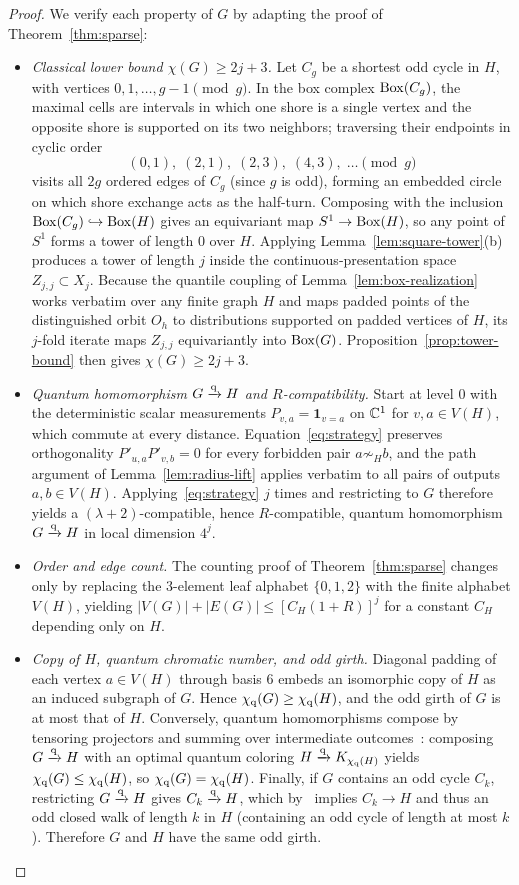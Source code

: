 \begin{proof}
We verify each property of $G$ by adapting the proof of Theorem~\ref{thm:sparse}:
\begin{itemize}
\item \emph{Classical lower bound $\chi(G)\ge2j+3$.} Let $C_g$ be a shortest odd cycle in $H$, with vertices $0,1,\ldots,g-1\pmod g$. In the box complex $\operatorname{Box}(C_g)$, the maximal cells are intervals in which one shore is a single vertex and the opposite shore is supported on its two neighbors; traversing their endpoints in cyclic order
\[
 (0,1),\;(2,1),\;(2,3),\;(4,3),\;\ldots\pmod g
\]
visits all $2g$ ordered edges of $C_g$ (since $g$ is odd), forming an embedded circle on which shore exchange acts as the half-turn. Composing with the inclusion $\operatorname{Box}(C_g)\hookrightarrow\operatorname{Box}(H)$ gives an equivariant map $S^1\to\operatorname{Box}(H)$, so any point of $S^1$ forms a tower of length $0$ over $H$. Applying Lemma~\ref{lem:square-tower}(b) produces a tower of length $j$ inside the continuous-presentation space $Z_{j,j}\subset X_j$. Because the quantile coupling of Lemma~\ref{lem:box-realization} works verbatim over any finite graph $H$ and maps padded points of the distinguished orbit $O_h$ to distributions supported on padded vertices of $H$, its $j$-fold iterate maps $Z_{j,j}$ equivariantly into $\operatorname{Box}(G)$. Proposition~\ref{prop:tower-bound} then gives $\chi(G)\ge2j+3$.
\item \emph{Quantum homomorphism $G\xrightarrow{\mathrm q} H$ and $R$-compatibility.} Start at level $0$ with the deterministic scalar measurements $P_{v,a}=\mathbf 1_{v=a}$ on $\mathbb C^1$ for $v,a\in V(H)$, which commute at every distance. Equation~\eqref{eq:strategy} preserves orthogonality $P'_{u,a}P'_{v,b}=0$ for every forbidden pair $a\not\sim_H b$, and the path argument of Lemma~\ref{lem:radius-lift} applies verbatim to all pairs of outputs $a,b\in V(H)$. Applying~\eqref{eq:strategy} $j$ times and restricting to $G$ therefore yields a $(\lambda+2)$-compatible, hence $R$-compatible, quantum homomorphism $G\xrightarrow{\mathrm q} H$ in local dimension $4^j$.
\item \emph{Order and edge count.} The counting proof of Theorem~\ref{thm:sparse} changes only by replacing the $3$-element leaf alphabet $\{0,1,2\}$ with the finite alphabet $V(H)$, yielding $|V(G)|+|E(G)|\le[C_H(1+R)]^j$ for a constant $C_H$ depending only on $H$.
\item \emph{Copy of $H$, quantum chromatic number, and odd girth.} Diagonal padding of each vertex $a\in V(H)$ through basis $6$ embeds an isomorphic copy of $H$ as an induced subgraph of $G$. Hence $\chi_{\mathrm q}(G)\ge\chi_{\mathrm q}(H)$, and the odd girth of $G$ is at most that of $H$. Conversely, quantum homomorphisms compose by tensoring projectors and summing over intermediate outcomes~\cite{MR}: composing $G\xrightarrow{\mathrm q} H$ with an optimal quantum coloring $H\xrightarrow{\mathrm q} K_{\chi_{\mathrm q}(H)}$ yields $\chi_{\mathrm q}(G)\le\chi_{\mathrm q}(H)$, so $\chi_{\mathrm q}(G)=\chi_{\mathrm q}(H)$. Finally, if $G$ contains an odd cycle $C_k$, restricting $G\xrightarrow{\mathrm q} H$ gives $C_k\xrightarrow{\mathrm q} H$, which by~\cite[Theorem~4.12 of arXiv~v2]{MR} implies $C_k\to H$ and thus an odd closed walk of length $k$ in $H$ (containing an odd cycle of length at most $k$). Therefore $G$ and $H$ have the same odd girth. \qedhere
\end{itemize}
\end{proof}

